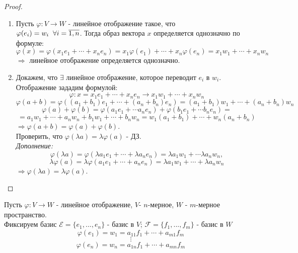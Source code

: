 \documentclass[a4paper, 12pt]{article}
\renewcommand{\phi}{\varphi}
\newcommand\tab[1][.5cm]{\hspace*{#1}}
\theoremstyle{definition}
\begin{document}
  \begin{proof} \tab
    \begin{enumerate}
      \item Пусть $\phi: V \to W$ - линейное отображение такое, что \\$\phi(e_i) = w_i \tab[0.2cm] \forall i = \overline{1,n}$. Тогда образ вектора $x$ определяется однозначно по формуле: $$\phi(x) = \phi(x_1e_1 + \cdots + x_ne_n) = x_1 \phi(e_1) + \cdots + x_n \phi(e_n) = x_1 w_1 + \cdots + x_n w_n$$
      $\Longrightarrow$ линейное отображение определяется однозначно.
      \item Докажем, что $\exists$ линейное отображение, которое переводит $e_i$ в $w_i$. Отображение зададим формулой: $$\phi: x = x_1e_1 + \cdots + x_ne_n \to x_1w_1 + \cdots + x_nw_n$$
      $$\phi(a+b) = \phi((a_1+b_1)e_1 + \cdots + (a_n + b_n)e_n) = (a_1+b_1)w_1 + \cdots + (a_n + b_n)w_n$$
      $$\phi(a) + \phi(b) = \phi(a_1e_1 + \cdots a_ne_n) + \phi(b_1e_1 + \cdots b_ne_n) = $$ $$= a_1w_1 + \cdots + a_nw_n + b_1w_1 + \cdots + b_nw_n = w_1(a_1 + b_1) + \cdots + w_n(a_n + b_n)$$
      $\Longrightarrow \phi(a+b) = \phi(a) + \phi(b).$\\
      Проверить, что $\phi(\lambda a) = \lambda \phi(a)$ - ДЗ. \\
      \textit{Дополнение:}
      $$\phi(\lambda a) = \phi(\lambda a_1 e_1 + \cdots + \lambda a_n e_n) = \lambda a_1 w_1 + \cdots \lambda a_n w_n,$$
      $$\lambda \phi(a) = \lambda \phi(a_1 e_1 + \cdots + a_n e_n) = \lambda a_1 w_1 + \cdots + \lambda a_n w_n$$
      $\Longrightarrow \phi(\lambda a) = \lambda \phi(a).$
    \end{enumerate}
  \end{proof} 
  Пусть $\phi: V \to W$ - линейное отображение, $V$- $n$-мерное, $W$ - $m$-мерное пространство.  \\
  Фиксируем базис 
  $\mathcal{E}  = \{e_1,...,e_n\}$ - базис в $V$; $\mathcal{F}  = \{f_1,...,f_m\}$ - базис в $W$
  $$\phi(e_1) = w_1 = a_{11}f_1 + \cdots + a_{m1}f_m$$ $$\vdots$$
  $$\phi(e_n) = w_n = a_{1n}f_1 + \cdots + a_{mn}f_m$$
\end{document}
